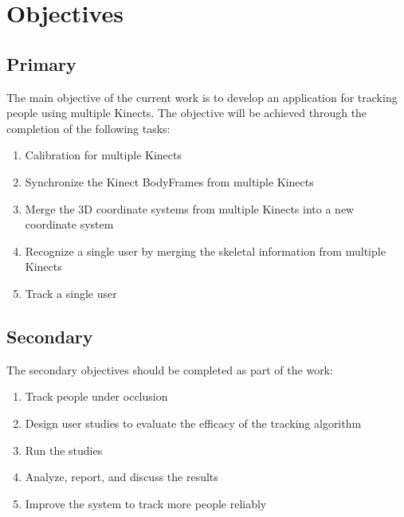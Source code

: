 


\chapter{Objectives}

\label{chapter:objectives}

\section{Primary}

The main objective of the current work is to develop an application for tracking people using multiple Kinects. The objective will be achieved through the completion of the following tasks:

\begin{enumerate}
  \item Calibration for multiple Kinects
  \item Synchronize the Kinect BodyFrames from multiple Kinects
  \item Merge the 3D coordinate systems from multiple Kinects into a new coordinate system
  \item Recognize a single user by merging the skeletal information from multiple Kinects
  \item Track a single user
\end{enumerate}

\section{Secondary}

The secondary objectives should be completed as part of the work:

\begin{enumerate}
  \item Track people under occlusion
  \item Design user studies to evaluate the efficacy of the tracking algorithm
  \item Run the studies
  \item Analyze, report, and discuss the results
  \item Improve the system to track more people reliably
\end{enumerate}



